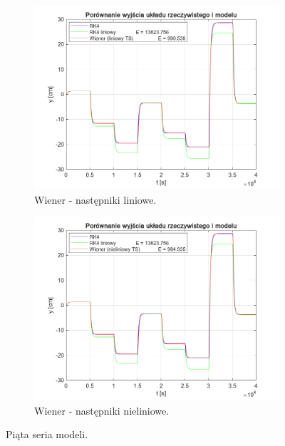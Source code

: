 \begin{figure}[b!]
\begin{subfigure}[b]{0.49\paperwidth}
\centering
\includegraphics[width=\linewidth]{pictures/WienerLinearModel_5}
\caption{Wiener - następniki liniowe.}
\end{subfigure}
\hfill
\begin{subfigure}[b]{0.49\paperwidth}
\centering
\includegraphics[width=\linewidth]{pictures/WienerNonlinearModel_5}
\caption{Wiener - następniki nieliniowe.}
\end{subfigure}

\caption{Piąta seria modeli.}
\end{figure}

\restoregeometry 
\newpage